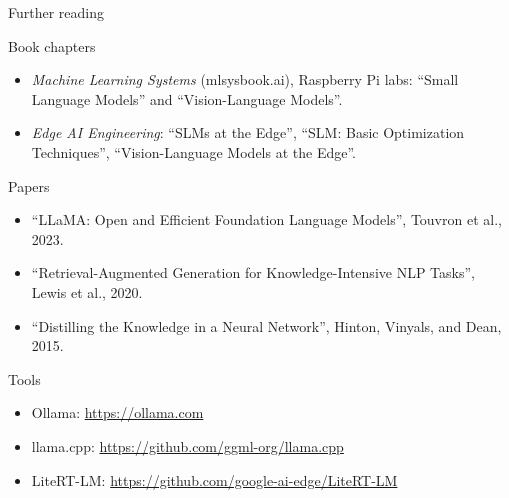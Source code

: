 \begin{frame}{Further reading}
  \footnotesize
  \begin{block}{Book chapters}
    \begin{itemize}
      \item \emph{Machine Learning Systems} (mlsysbook.ai), Raspberry Pi labs:
            ``Small Language Models'' and ``Vision-Language Models''.
      \item \emph{Edge AI Engineering}: ``SLMs at the Edge'', ``SLM: Basic
            Optimization Techniques'', ``Vision-Language Models at the Edge''.
    \end{itemize}
  \end{block}
  \begin{block}{Papers}
    \begin{itemize}
      \item ``LLaMA: Open and Efficient Foundation Language Models'', Touvron
            et al., 2023.
      \item ``Retrieval-Augmented Generation for Knowledge-Intensive NLP
            Tasks'', Lewis et al., 2020.
      \item ``Distilling the Knowledge in a Neural Network'', Hinton, Vinyals,
            and Dean, 2015.
    \end{itemize}
  \end{block}
  \begin{block}{Tools}
    \begin{itemize}
      \item Ollama: \url{https://ollama.com}
      \item llama.cpp: \url{https://github.com/ggml-org/llama.cpp}
      \item LiteRT-LM: \url{https://github.com/google-ai-edge/LiteRT-LM}
    \end{itemize}
  \end{block}
\end{frame}
